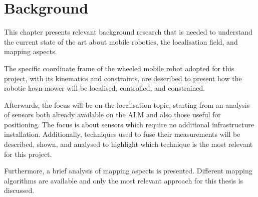 \chapter{Background}
\label{ch:background}





\noindent This chapter presents relevant background research that is needed to understand the current state of the art about mobile robotics, the localisation field, and mapping aspects.

The specific coordinate frame of the wheeled mobile robot adopted for this project, with its kinematics and constraints, are described to present how the robotic lawn mower will be localised, controlled, and constrained.

Afterwards, the focus will be on the localisation topic, starting from an analysis of sensors both already available on the \gls{ALM} and also those useful for positioning.
The focus is about sensors which require no additional infrastructure installation.
Additionally, techniques used to fuse their measurements will be described, shown, and analysed to highlight which technique is the most relevant for this project.

Furthermore, a brief analysis of mapping aspects is presented.
Different mapping algorithms are available and only the most relevant approach for this thesis is discussed.

